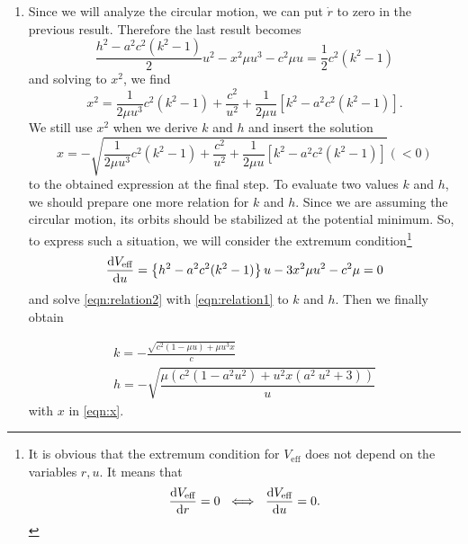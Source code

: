 \documentclass[a4paper,pdftex,10pt]{article}
\begin{document}
\begin{enumerate}
  \item
        Since we will analyze the circular motion, we can put $\dot{r}$ to zero in the previous result. Therefore the last result becomes
        \begin{equation}
          \frac{h^2-a^2c^2(k^2-1)}{2}u^2
          -
          x^2\mu u^3
          -
          c^2\mu u
          =
          \frac{1}{2}c^2(k^2-1)
          \label{eqn:relation1}
        \end{equation}
        and solving to $x^2$, we find
        \begin{equation}
          x^2
          =
          \frac{1}{2\mu u^3}c^2(k^2-1)
          +
          \frac{c^2}{u^2}
          +
          \frac{1}{2\mu u}\left[ k^2-a^2c^2(k^2-1) \right]
          .
        \end{equation}
        We still use $x^2$ when we derive $k$ and $h$ and insert the solution
        \begin{equation}
          x
          =
          -
          \sqrt{
            \frac{1}{2\mu u^3}c^2(k^2-1)
            +
            \frac{c^2}{u^2}
            +
            \frac{1}{2\mu u}\left[ k^2-a^2c^2(k^2-1) \right]
          }
          (<
          0)
          \label{eqn:x}
        \end{equation}
        to the obtained expression at the final step. To evaluate two values $k$ and $h$, we should prepare one more relation for $k$ and $h$. Since we are assuming the circular motion, its orbits should be stabilized at the potential minimum. So, to express such a situation, we will consider the extremum condition\footnote{
          It is obvious that the extremum condition for $V_{\textrm{eff}}$ does not depend on the variables $r, u$. It means that
          $$
            \dv{V_{\textrm{eff}}}{r}
            =
            0
            \ \iff\
            \dv{V_{\textrm{eff}}}{u}
            =
            0
            .
          $$
        }
        \begin{equation}
          \dv{V_{\textrm{eff}}}{u}
          =
          \left\{ h^2-a^2c^2(k^2-1) \right\}u
          -
          3x^2\mu u^2
          -
          c^2\mu
          =
          0
          \label{eqn:relation2}
        \end{equation}
        and solve \eqref{eqn:relation2} with \eqref{eqn:relation1} to $k$ and $h$. Then we finally obtain
        \begin{graybox}
          \vspace*{-5pt}
          \begin{gather}
            k
            =
            -\frac{\sqrt{c^2 (1-\mu  u)+\mu  u^3 x}}{c}
            \label{eqn:k}
            \\
            h
            =
            -
            \sqrt{\dfrac{\mu  \left(c^2 \left(1-a^2 u^2\right)+u^2 x \left(a^2 \
                u^2+3\right)\right)}{u}}
            \label{eqn:h}
          \end{gather}
          with $x$ in \eqref{eqn:x}.
        \end{graybox}



\end{enumerate}
\end{document}
